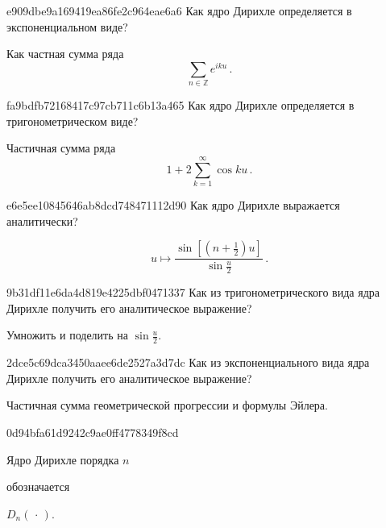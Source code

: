 \begin{note}{e909dbe9a169419ea86fe2c964eae6a6}
    Как ядро Дирихле определяется в экспоненциальном виде?

    \begin{cloze}{1}
        Как частная сумма ряда
        \[
            \sum_{n \in \mathbb Z} e^{i ku}\,.
        \]
    \end{cloze}
\end{note}

\begin{note}{fa9bdfb72168417c97cb711c6b13a465}
    Как ядро Дирихле определяется в тригонометрическом виде?

    \begin{cloze}{1}
        Частичная сумма ряда
        \[
            1 + 2 \sum_{k = 1}^{\infty} \cos ku\,.
        \]
    \end{cloze}
\end{note}

\begin{note}{e6e5ee10845646ab8dcd748471112d90}
    Как ядро Дирихле выражается аналитически?

    \begin{cloze}{1}
        \[
            u \mapsto \frac{\sin \left[ (n+\frac{1}{2})u \right]}{\sin \frac{u}{2}}\,.
        \]
    \end{cloze}
\end{note}

\begin{note}{9b31df11e6da4d819e4225dbf0471337}
    Как из тригонометрического вида ядра Дирихле получить его аналитическое выражение?

    \begin{cloze}{1}
        Умножить и поделить на \({ \sin \frac{u}{2} }\).
    \end{cloze}
\end{note}

\begin{note}{2dce5c69dca3450aaee6de2527a3d7dc}
    Как из экспоненциального вида ядра Дирихле получить его аналитическое выражение?

    \begin{cloze}{1}
        Частичная сумма геометрической прогрессии и формулы Эйлера.
    \end{cloze}
\end{note}

\begin{note}{0d94bfa61d9242c9ae0ff4778349f8cd}
    \begin{icloze}{2}Ядро Дирихле порядка \({ n }\)\end{icloze} обозначается \begin{icloze}{1}\({ D_n (\,\cdot\,) }\).\end{icloze}
\end{note}


